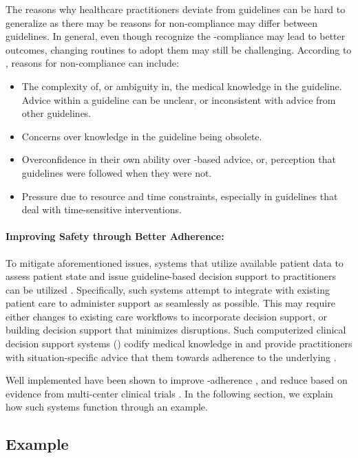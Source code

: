 The reasons why healthcare practitioners deviate from guidelines
can be hard to generalize as there may be reasons for non-compliance
may differ between guidelines. In general, even though \HCPs{}
recognize the \BPGs{}-compliance may lead to better outcomes, changing
routines to adopt them may still be challenging. According to
\cite{BarthCCLM16}, reasons for non-compliance can include:
\begin{itemize}
  \item The complexity of, or ambiguity in, the medical knowledge in the
    guideline. Advice within a guideline can be unclear, or inconsistent
    with advice from other guidelines.
  \item Concerns over knowledge in the guideline being obsolete.
  \item Overconfidence in their own ability over \BPG{}-based advice, or,
        perception that guidelines were followed when they were not.
  \item Pressure due to resource and time constraints, especially in guidelines
    that deal with time-sensitive interventions.
\end{itemize}

\paragraph{Improving Safety through Better Adherence:}

To mitigate aforementioned issues, systems that utilize available
patient data to assess patient state and issue guideline-based
decision support to practitioners can be utilized \cite{DeClerqSHTI08}.
Specifically, such systems attempt to integrate with existing patient care
to administer support as seamlessly as possible. This may require
either changes to existing care workflows to incorporate decision support,
or building decision support that minimizes disruptions.
Such computerized clinical decision support systems (\CDSSs{}) codify
medical knowledge in \BPGs{} and provide practitioners with
situation-specific advice that  them towards adherence
to the underlying \BPG{}.

Well implemented \CDSSs{} have been shown to improve
\BPG{}-adherence \cite{GargJAMA06,KawamotoBMJ05}, and reduce
\PMEs{} based on evidence from multi-center clinical trials \cite{BenettJAMIA16,SahotaJIS11}.
In the following section, we explain how such systems function through an
example.

\subsection{\CDSS{} Example}\label{sec:cdss-example}

